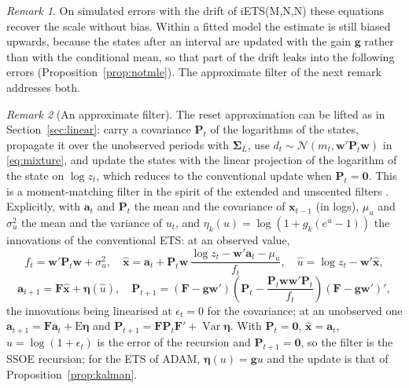 \documentclass[11pt,a4paper]{article}
\newcommand{\vect}[1]{\mathbf{#1}}
\newcommand{\E}{\mathrm{E}}
\DeclareMathOperator{\Var}{Var}
\theoremstyle{remark}
\newtheorem{remark}{Remark}
\begin{document}
\begin{remark}
On simulated errors with the drift of iETS(M,N,N) these equations recover the scale without bias.
Within a fitted model the estimate is still biased upwards, because the states after an interval
are updated with the gain $\vect g$ rather than with the conditional mean, so that part of the drift
leaks into the following errors (Proposition~\ref{prop:notmle}). The approximate filter of the next
remark addresses both.
\end{remark}

\begin{remark}[An approximate filter]
\label{rem:approxfilter}
The reset approximation can be lifted as in Section~\ref{sec:linear}: carry a covariance
$\vect P_t$ of the logarithms of the states, propagate it over the unobserved periods with
$\boldsymbol\Sigma_L$, use $d_t\sim\mathcal N(m_t, \vect w'\vect P_t\vect w)$ in \eqref{eq:mixture},
and update the states with the linear projection of the logarithm of the state on $\log z_t$, which
reduces to the conventional update when $\vect P_t = \vect 0$. This is a moment-matching filter in the
spirit of the extended and unscented filters \citep{DurbinKoopman2012}. Explicitly, with
$\vect a_t$ and $\vect P_t$ the mean and the covariance of $\vect x_{t-1}$ (in logs), $\mu_u$ and
$\sigma_u^2$ the mean and the variance of $u_t$, and $\eta_k(u) = \log(1 + g_k(e^u - 1))$ the
innovations of the conventional ETS: at an observed value,
\[
f_t = \vect w'\vect P_t\vect w + \sigma_u^2,\quad
\hat{\vect x} = \vect a_t + \vect P_t\vect w\,\frac{\log z_t - \vect w'\vect a_t - \mu_u}{f_t},\quad
\hat u = \log z_t - \vect w'\hat{\vect x},
\]
\[
\vect a_{t+1} = \vect F\hat{\vect x} + \boldsymbol\eta(\hat u),\quad
\vect P_{t+1} = (\vect F - \vect g\vect w')\left(\vect P_t - \frac{\vect P_t\vect w\vect w'\vect P_t}{f_t}\right)
(\vect F - \vect g\vect w')',
\]
the innovations being linearised at $\epsilon_t = 0$ for the covariance; at an unobserved one
$\vect a_{t+1} = \vect F\vect a_t + \E\boldsymbol\eta$ and
$\vect P_{t+1} = \vect F\vect P_t\vect F' + \Var\boldsymbol\eta$. With $\vect P_t = \vect 0$,
$\hat{\vect x} = \vect a_t$, $\hat u = \log(1+\epsilon_t)$ is the error of the recursion and
$\vect P_{t+1} = \vect 0$, so the filter is the SSOE recursion; for the ETS of ADAM, $\boldsymbol\eta(u) =
\vect g u$ and the update is that of Proposition~\ref{prop:kalman}.
\end{remark}

\end{document}
